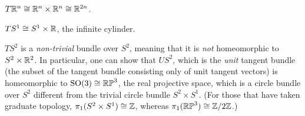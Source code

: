 \begin{example}
	$T \mathbb{R}^n \cong \mathbb{R}^n \times \mathbb{R}^n \cong \mathbb{R}^{2n}$.
\end{example}

\begin{example}
	$T S^1 \cong S^1 \times \mathbb{R}$, the infinite cylinder.
\end{example}

\begin{example}
	$TS^2$ is a \emph{non-trivial} bundle over $S^2$, meaning that it is \emph{not} homeomorphic to $S^2 \times \mathbb{R}^2$. In particular, one can show that $US^2$, which is the \emph{unit} tangent bundle (the subset of the tangent bundle consisting only of unit tangent vectors) is homeomorphic to $\operatorname{SO}(3) \cong \mathbb{RP}^3$, the real projective space, which is a circle bundle over $S^2$ different from the trivial circle bundle $S^2 \times S^1$. (For those that have taken graduate topology, $\pi_1(S^2 \times S^1) \cong \mathbb{Z}$, whereas $\pi_1(\mathbb{RP}^3) \cong \mathbb{Z}/2\mathbb{Z}$.)
\end{example}